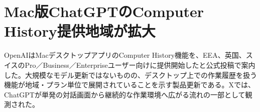 \section{Mac版ChatGPTのComputer History提供地域が拡大}
OpenAIはMacデスクトップアプリのComputer History機能を、EEA、英国、スイスのPro／Business／Enterpriseユーザー向けに提供開始したと公式投稿で案内した。大規模なモデル更新ではないものの、デスクトップ上での作業履歴を扱う機能が地域・プラン単位で展開されていることを示す製品更新である。Xでは、ChatGPTが単発の対話画面から継続的な作業環境へ広がる流れの一部として観測された。
